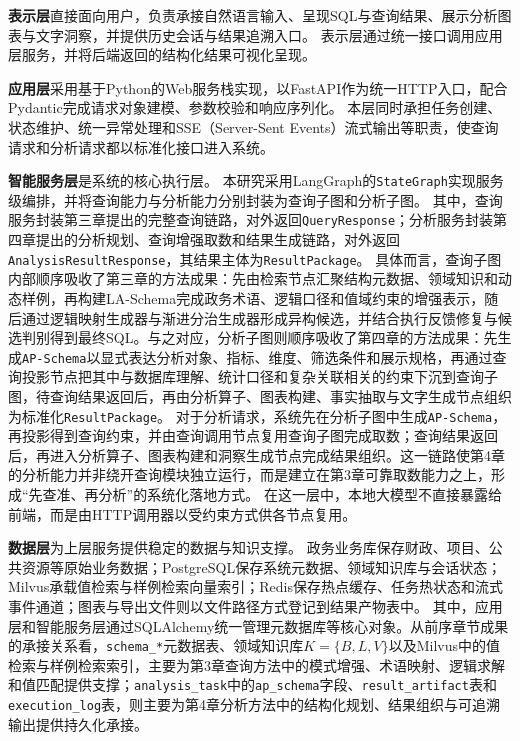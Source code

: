 \textbf{表示层}直接面向用户，负责承接自然语言输入、呈现SQL与查询结果、展示分析图表与文字洞察，并提供历史会话与结果追溯入口。
表示层通过统一接口调用应用层服务，并将后端返回的结构化结果可视化呈现。

\textbf{应用层}采用基于Python的Web服务栈实现，以FastAPI作为统一HTTP入口，配合Pydantic完成请求对象建模、参数校验和响应序列化。
本层同时承担任务创建、状态维护、统一异常处理和SSE（Server-Sent Events）流式输出等职责，使查询请求和分析请求都以标准化接口进入系统。

\textbf{智能服务层}是系统的核心执行层。
本研究采用LangGraph的\texttt{StateGraph}实现服务级编排，并将查询能力与分析能力分别封装为查询子图和分析子图。
其中，查询服务封装第三章提出的完整查询链路，对外返回\texttt{QueryResponse}；分析服务封装第四章提出的分析规划、查询增强取数和结果生成链路，对外返回\texttt{AnalysisResultResponse}，其结果主体为\texttt{ResultPackage}。
具体而言，查询子图内部顺序吸收了第三章的方法成果：先由检索节点汇聚结构元数据、领域知识和动态样例，再构建LA-Schema完成政务术语、逻辑口径和值域约束的增强表示，随后通过逻辑映射生成器与渐进分治生成器形成异构候选，并结合执行反馈修复与候选判别得到最终SQL。与之对应，分析子图则顺序吸收了第四章的方法成果：先生成\texttt{AP-Schema}以显式表达分析对象、指标、维度、筛选条件和展示规格，再通过查询投影节点把其中与数据库理解、统计口径和复杂关联相关的约束下沉到查询子图，待查询结果返回后，再由分析算子、图表构建、事实抽取与文字生成节点组织为标准化\texttt{ResultPackage}。
对于分析请求，系统先在分析子图中生成\texttt{AP-Schema}，再投影得到查询约束，并由查询调用节点复用查询子图完成取数；查询结果返回后，再进入分析算子、图表构建和洞察生成节点完成结果组织。这一链路使第4章的分析能力并非绕开查询模块独立运行，而是建立在第3章可靠取数能力之上，形成“先查准、再分析”的系统化落地方式。
在这一层中，本地大模型不直接暴露给前端，而是由HTTP调用器以受约束方式供各节点复用。

\textbf{数据层}为上层服务提供稳定的数据与知识支撑。
政务业务库保存财政、项目、公共资源等原始业务数据；PostgreSQL保存系统元数据、领域知识库与会话状态；Milvus承载值检索与样例检索向量索引；Redis保存热点缓存、任务热状态和流式事件通道；图表与导出文件则以文件路径方式登记到结果产物表中。
其中，应用层和智能服务层通过SQLAlchemy统一管理元数据库等核心对象。从前序章节成果的承接关系看，\texttt{schema\_*}元数据表、领域知识库$K=\{B,L,V\}$以及Milvus中的值检索与样例检索索引，主要为第3章查询方法中的模式增强、术语映射、逻辑求解和值匹配提供支撑；\texttt{analysis\_task}中的\texttt{ap\_schema}字段、\texttt{result\_artifact}表和\texttt{execution\_log}表，则主要为第4章分析方法中的结构化规划、结果组织与可追溯输出提供持久化承接。

